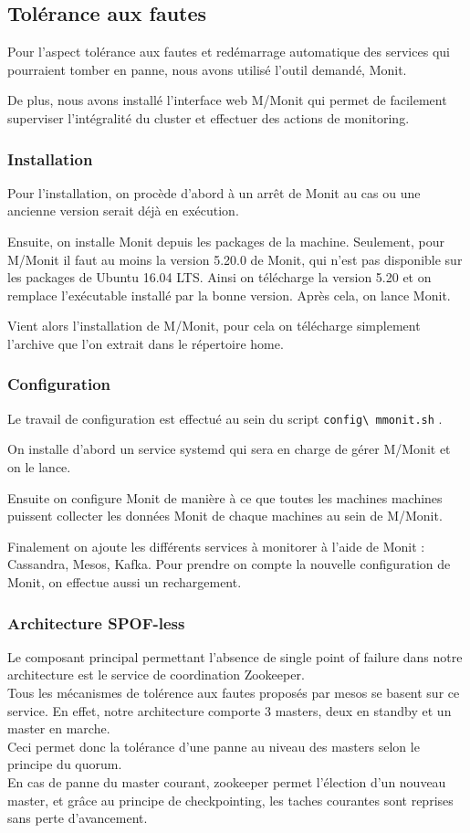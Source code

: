 \documentclass[a4paper, 11pt, titlepage]{article}
\begin{document}
\subsection {Tolérance aux fautes}

Pour l'aspect tolérance aux fautes et redémarrage automatique des services qui pourraient tomber en panne, nous avons utilisé l'outil demandé, Monit.

De plus, nous avons installé l'interface web M/Monit qui permet de facilement superviser l'intégralité du cluster et effectuer des actions de monitoring.


\subsubsection {Installation}

Pour l'installation, on procède d'abord à un arrêt de Monit au cas ou une ancienne version serait déjà en exécution.

Ensuite, on installe Monit depuis les packages de la machine. Seulement, pour M/Monit il faut au moins la version 5.20.0 de Monit, qui n'est pas disponible sur les packages de Ubuntu 16.04 LTS. Ainsi on télécharge la version 5.20 et on remplace l'exécutable installé par la bonne version. Après cela, on lance Monit.

Vient alors l'installation de M/Monit, pour cela on télécharge simplement l'archive que l'on extrait dans le répertoire home.


\subsubsection {Configuration}

Le travail de configuration est effectué au sein du script \lstinline!config\ mmonit.sh! .

On installe d'abord un service systemd qui sera en charge de gérer M/Monit et on le lance.

Ensuite on configure Monit de manière à ce que toutes les machines machines puissent collecter les données Monit de chaque machines au sein de M/Monit.

Finalement on ajoute les différents services à monitorer à l'aide de Monit : Cassandra, Mesos, Kafka.
Pour prendre on compte la nouvelle configuration de Monit, on effectue aussi un rechargement.


\subsubsection {Architecture SPOF-less}
Le composant principal permettant l'absence de single point of failure dans notre architecture est le service de coordination Zookeeper.
\\Tous les mécanismes de tolérence aux fautes proposés par mesos se basent sur ce service. En effet, notre architecture comporte 3 masters, deux en standby et un master en marche. \\Ceci permet donc la tolérance d'une panne au niveau des masters selon le principe du quorum. \\En cas de panne du master courant, zookeeper permet l'élection d'un nouveau master, et grâce au principe de checkpointing, les taches courantes sont reprises sans perte d'avancement.
\end{document}

